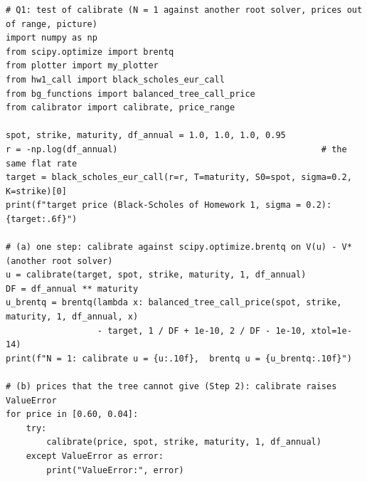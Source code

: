 \documentclass[11pt,a4paper]{article}
\begin{document}
\par\smallskip\noindent\begin{minipage}{\linewidth}\begin{lstlisting}[style=pysmall,title={test (\texttt{q1\_calibrate\_test.py})}]
# Q1: test of calibrate (N = 1 against another root solver, prices out of range, picture)
import numpy as np
from scipy.optimize import brentq
from plotter import my_plotter
from hw1_call import black_scholes_eur_call
from bg_functions import balanced_tree_call_price
from calibrator import calibrate, price_range

spot, strike, maturity, df_annual = 1.0, 1.0, 1.0, 0.95
r = -np.log(df_annual)                                        # the same flat rate
target = black_scholes_eur_call(r=r, T=maturity, S0=spot, sigma=0.2, K=strike)[0]
print(f"target price (Black-Scholes of Homework 1, sigma = 0.2): {target:.6f}")

# (a) one step: calibrate against scipy.optimize.brentq on V(u) - V* (another root solver)
u = calibrate(target, spot, strike, maturity, 1, df_annual)
DF = df_annual ** maturity
u_brentq = brentq(lambda x: balanced_tree_call_price(spot, strike, maturity, 1, df_annual, x)
                  - target, 1 / DF + 1e-10, 2 / DF - 1e-10, xtol=1e-14)
print(f"N = 1: calibrate u = {u:.10f},  brentq u = {u_brentq:.10f}")

# (b) prices that the tree cannot give (Step 2): calibrate raises ValueError
for price in [0.60, 0.04]:
    try:
        calibrate(price, spot, strike, maturity, 1, df_annual)
    except ValueError as error:
        print("ValueError:", error)


\end{lstlisting}
\end{minipage}
\end{document}
